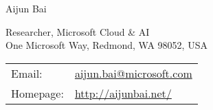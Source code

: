 \documentclass[letterpaper, fontset=adobe, 10pt]{ctexart}
\def\name{Aijun Bai}
\begin{document}
\begin{flushleft}
	{\huge \name} 
\end{flushleft}

\bigskip

\begin{minipage}{0.5\textwidth}
	Researcher, Microsoft Cloud \& AI \\
	One Microsoft Way, Redmond, WA 98052, USA
\end{minipage}
\hspace{0.5em}
\begin{minipage}{0.45\textwidth}
	\begin{tabular}{ll}
		Email:    & \href{mailto:aijun.bai@microsoft.com}{\rm aijun.bai@microsoft.com} \\
		Homepage: & \url{http://aijunbai.net/}                                         \\
	\end{tabular}
\end{minipage}

\vspace{40pt}
\end{document}
